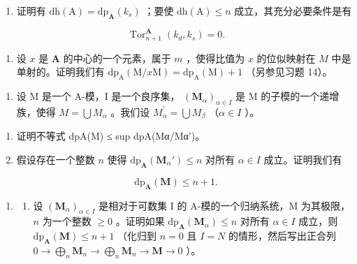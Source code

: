\begin{enumerate}
\def\labelenumi{\alph{enumi})}
\setcounter{enumi}{1}
\tightlist
\item
  证明有 \(\mathrm{dh(A)} = \mathrm{dp}_{\mathbf{A}}(k_s)\) ；要使 \(\mathrm{dh(A)} \leqslant n\) 成立，其充分必要条件是有
\end{enumerate}

\[
\operatorname{Tor} _ {n + 1} ^ {\mathbf {A}} \left(k _ {d}, k _ {s}\right) = 0.
\]

\begin{enumerate}
\def\labelenumi{\alph{enumi})}
\setcounter{enumi}{2}
\tightlist
\item
  设 \(x\) 是 \(\mathbf{A}\) 的中心的一个元素，属于 \(m\) ，使得比值为 \(x\) 的位似映射在 \(M\) 中是单射的。证明我们有 \(\mathrm{dp}_{\mathrm{A}}(\mathrm{M}/x\mathrm{M}) = \mathrm{dp}_{\mathrm{A}}(\mathrm{M}) + 1\) （另参见习题 14）。
\end{enumerate}

\begin{enumerate}
\def\labelenumi{\arabic{enumi})}
\setcounter{enumi}{16}
\tightlist
\item
  设 M 是一个 A-模，I 是一个良序集， \((\mathbf{M}_{\alpha})_{\alpha \in I}\) 是 M 的子模的一个递增族，使得 \(M = \bigcup M_{\alpha}\) 。我们设 \(M_{\alpha}^{\prime} = \bigcup M_{\beta}\) （\(\alpha \in I\) ）。
\end{enumerate}

\begin{enumerate}
\def\labelenumi{\alph{enumi})}
\item
  证明不等式 dpA(M) ≤ sup dpA(Mα/Mα')。
\item
  假设存在一个整数 \(n\) 使得 \(\mathrm{dp}_{\mathbf{A}}(\mathbf{M}_{\alpha}') \leqslant n\) 对所有 \(\alpha \in I\) 成立。证明我们有
\end{enumerate}

\[
\mathrm{dp} _ {\mathbf {A}} (\mathbf {M}) \leqslant n + 1.
\]

\begin{enumerate}
\def\labelenumi{\arabic{enumi})}
\setcounter{enumi}{17}
\tightlist
\item
  \begin{enumerate}
  \def\labelenumii{\alph{enumii})}
  \tightlist
  \item
    设 \((\mathbf{M}_{\alpha})_{\alpha \in I}\) 是相对于可数集 I 的 A-模的一个归纳系统，M 为其极限， \(n\) 为一个整数 \(\geqslant 0\) 。证明如果 \(\mathrm{dp}_{\mathbf{A}}(\mathbf{M}_{\alpha}) \leqslant n\) 对所有 \(\alpha \in I\) 成立，则 \(\mathrm{dp}_{\mathbf{A}}(\mathbf{M}) \leqslant n + 1\) （化归到 \(n = 0\) 且 \(I = N\) 的情形，然后写出正合列 \(0 \to \bigoplus_{n} \mathbf{M}_{n} \to \bigoplus_{n} \mathbf{M}_{n} \to \mathbf{M} \to 0\) ）。
  \end{enumerate}
\end{enumerate}

